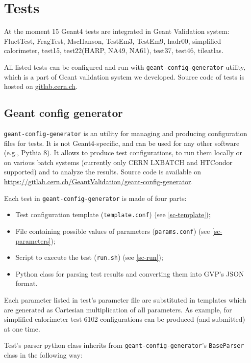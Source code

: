\section{Tests}
\label{sec-tests}

At the moment 15 Geant4 tests are integrated in Geant Validation system: FluctTest, FragTest, MscHanson, TestEm3, TestEm9, hadr00, simplified calorimeter, test15, test22(HARP, NA49, NA61), test37, test46, tileatlas.

All listed tests can be configured and run with {\tt geant-config-generator} utility, which is a part of Geant validation system we developed. Source code of tests is hosted on \url{gitlab.cern.ch}.

\subsection{Geant config generator}
\label{sec-geant-config-generator}

{\tt geant-config-generator} is an utility for managing and producing configuration files for tests. It is not Geant4-specific, and can be used for any other software (e.g., Pythia 8). It allows to produce test configurations, to run them locally or on various batch systems (currently only CERN LXBATCH and HTCondor supported) and to analyze the results. Source code is available on \url{https://gitlab.cern.ch/GeantValidation/geant-config-generator}.

Each test in {\tt geant-config-generator} is made of four parts:

\begin{itemize}
	\item Test configuration template ({\tt template.conf}) (see \ref{sc-template});
	\item File containing possible values of parameters ({\tt params.conf}) (see \ref{sc-parameters});
	\item Script to execute the test ({\tt run.sh}) (see \ref{sc-run});
	\item Python class for parsing test results and converting them into GVP's JSON format.
\end{itemize}

Each parameter listed in test's parameter file are substituted in templates which are generated as Cartesian multiplication of all parameters. As example, for simplified calorimeter test 6102 configurations can be produced (and submitted) at one time.

Test's parser python class inherits from {\tt geant-config-generator}'s {\tt BaseParser} class in the following way:

